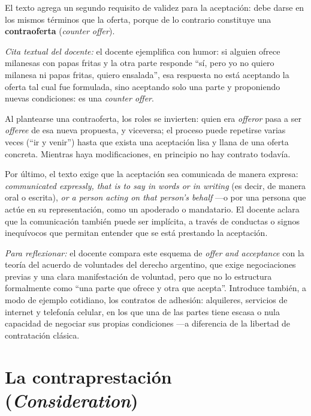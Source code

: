 \documentclass[12pt,oneside]{book}
\begin{document}
El texto agrega un segundo requisito de validez para la aceptación: debe darse en los mismos términos que la oferta, porque de lo contrario constituye una \textbf{contraoferta} (\textit{counter offer}).

\begin{note}
\textit{Cita textual del docente:} el docente ejemplifica con humor: si alguien ofrece milanesas con papas fritas y la otra parte responde ``sí, pero yo no quiero milanesa ni papas fritas, quiero ensalada'', esa respuesta no está aceptando la oferta tal cual fue formulada, sino aceptando solo una parte y proponiendo nuevas condiciones: es una \textit{counter offer}.
\end{note}

Al plantearse una contraoferta, los roles se invierten: quien era \textit{offeror} pasa a ser \textit{offeree} de esa nueva propuesta, y viceversa; el proceso puede repetirse varias veces (``ir y venir'') hasta que exista una aceptación lisa y llana de una oferta concreta. Mientras haya modificaciones, en principio no hay contrato todavía.

Por último, el texto exige que la aceptación sea comunicada de manera expresa: \textit{communicated expressly, that is to say in words or in writing} (es decir, de manera oral o escrita), \textit{or a person acting on that person's behalf} —o por una persona que actúe en su representación, como un apoderado o mandatario. El docente aclara que la comunicación también puede ser implícita, a través de conductas o signos inequívocos que permitan entender que se está prestando la aceptación.

\begin{note}
\textit{Para reflexionar:} el docente compara este esquema de \textit{offer and acceptance} con la teoría del acuerdo de voluntades del derecho argentino, que exige negociaciones previas y una clara manifestación de voluntad, pero que no lo estructura formalmente como ``una parte que ofrece y otra que acepta''. Introduce también, a modo de ejemplo cotidiano, los contratos de adhesión: alquileres, servicios de internet y telefonía celular, en los que una de las partes tiene escasa o nula capacidad de negociar sus propias condiciones —a diferencia de la libertad de contratación clásica.
\end{note}

\section{La contraprestación (\textit{Consideration})}
\end{document}
